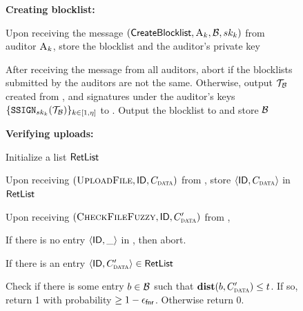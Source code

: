 \begin{figure}[h]
{\begin{minipage}[t]{0.45\textwidth}
		\smallskip\noindent\textbf{Creating blocklist:} 
		\enumListStart
		
	\item	Upon receiving the message $(\createBlocklist, \auditor[\auditorIdx], \blocklist, \privKey[\auditorIdx])$ from auditor $\auditor[\auditorIdx]$, store the blocklist and the auditor's private key


		\item After receiving the \createBlocklist message from all auditors, abort if the blocklists submitted by the auditors are not the same. Otherwise, output $\blklistToken$ created from \blocklist, and signatures under the auditor's keys $\{ \signGenSig[\auditorPrivKeyGenericScheme[\auditorIdx]](\blklistToken) \}_{\auditorIdx \in [1, \numAuditors]}$ to \client. Output the blocklist \blocklist to \server and store $\blocklist$

		\enumListEnd
		
		\smallskip\noindent\textbf{Verifying uploads:} 
		
	
	


		
		\enumListStartResume
		\item Initialize a list $\mathsf{RetList}$ 
		\item Upon receiving $(\uploadFile, \genericFileID, \clientMeta)$ from \client, store $\langle \genericFileID, \clientMeta \rangle$ in $\mathsf{RetList}$  

	
	\item Upon receiving $(\checkContentFuzzy,  \genericFileID, \clientMeta')$ from \server, 
		\enumListStart
		\item If there is no entry $\langle \mathsf{ID}, \_ \rangle$ in \retList, then abort. 
		\item If there is an entry $\langle \genericFileID, \clientMeta' \rangle \in \retList$

				\itemListStart
		\item Check if there is some entry $\genericBlocklistElmt \in \blocklist$ such that $\distanceNotation[\distance][\genericBlocklistElmt][\clientMeta'] \le \threshold$. If so, return 1 with probability $\ge 1 - \epsilon_\mathsf{fnr}$. Otherwise return 0. 





\end{minipage}}
\end{figure}
